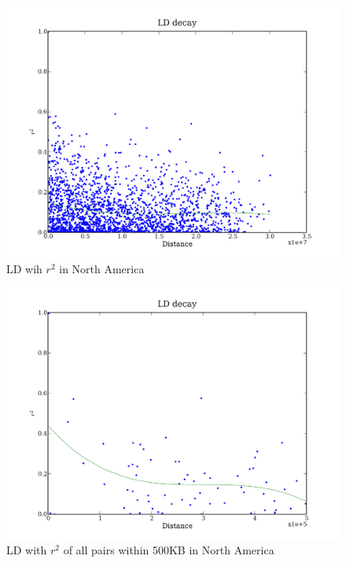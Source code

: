 \documentclass[a4paper,10pt]{article}
\begin{document}
\begin{figure}
\includegraphics[width=1\textwidth]{figures/data_NorAmer_d110_c0_5_LD_r2_0.png}
\caption{LD wih $r^2$ in North America}\label{fld_13}
\end{figure}

\begin{figure}
\includegraphics[width=1\textwidth]{figures/data_NorAmer_d110_c0_5_LD_r2_500000.png}
\caption{LD with $r^2$ of all pairs within 500KB in North America}\label{fld_14}
\end{figure}
\end{document}
